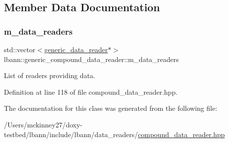 \subsection{Member Data Documentation}
\mbox{\label{classlbann_1_1generic__compound__data__reader_a9815e94ade5873415fd766e09d956d5b}} 
\subsubsection{\texorpdfstring{m\+\_\+data\+\_\+readers}{m\_data\_readers}}
{\footnotesize\ttfamily std\+::vector$<$\hyperlink{classlbann_1_1generic__data__reader}{generic\+\_\+data\+\_\+reader}$\ast$$>$ lbann\+::generic\+\_\+compound\+\_\+data\+\_\+reader\+::m\+\_\+data\+\_\+readers\hspace{0.3cm}{\ttfamily [protected]}}



List of readers providing data. 



Definition at line 118 of file compound\+\_\+data\+\_\+reader.\+hpp.



The documentation for this class was generated from the following file\+:\begin{DoxyCompactItemize}
\item 
/\+Users/mckinney27/doxy-\/testbed/lbann/include/lbann/data\+\_\+readers/\hyperlink{compound__data__reader_8hpp}{compound\+\_\+data\+\_\+reader.\+hpp}\end{DoxyCompactItemize}
